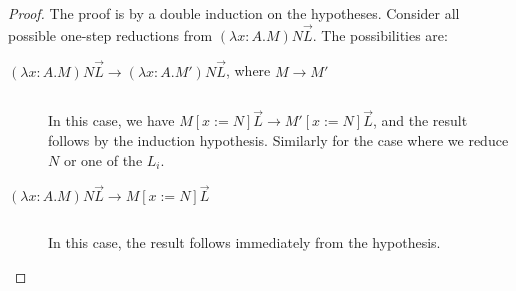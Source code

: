 \begin{lemma}
\end{lemma}

\begin{proof}

The proof is by a double induction on the hypotheses.  Consider all possible one-step reductions from $(\lambda x:A.M) N \vec{L}$.  The possibilities are:
\begin{description}
\item[$(\lambda x:A.M) N \vec{L} \rightarrow (\lambda x:A.M')N \vec{L}$, where $M \rightarrow M'$]
$ $

In this case, we have $M[x:=N] \vec{L} \rightarrow M'[x:=N] \vec{L}$, and the result follows by the induction hypothesis.  Similarly for the case
where we reduce $N$ or one of the $L_i$.
\item[$(\lambda x:A.M)N \vec{L} \rightarrow M{[x:=N]} \vec{L}$]
$ $

In this case, the result follows immediately from the hypothesis.
\end{description}
\end{proof}




